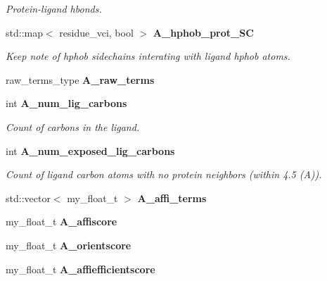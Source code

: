 \begin{CompactItemize}
\begin{CompactList}\small\item\em Protein-ligand hbonds. \item\end{CompactList}\item 
std::map$<$ residue\_\-vci, bool $>$ \bf{A\_\-hphob\_\-prot\_\-SC}\label{classSimSite3D_1_1ProtLigScore_d821097b1cb76b5bcc2e784d923c64f1}

\begin{CompactList}\small\item\em Keep note of hphob sidechains interating with ligand hphob atoms. \item\end{CompactList}\item 
raw\_\-terms\_\-type \textbf{A\_\-raw\_\-terms}\label{classSimSite3D_1_1ProtLigScore_6057aed97ad9d2f821e0243d0e991824}

\item 
int \bf{A\_\-num\_\-lig\_\-carbons}\label{classSimSite3D_1_1ProtLigScore_e8f1ebf48410e8bfa049bf7dad668351}

\begin{CompactList}\small\item\em Count of carbons in the ligand. \item\end{CompactList}\item 
int \bf{A\_\-num\_\-exposed\_\-lig\_\-carbons}\label{classSimSite3D_1_1ProtLigScore_6886d65b0975f0c237500478ba4a198c}

\begin{CompactList}\small\item\em Count of ligand carbon atoms with no protein neighbors (within 4.5 (A)). \item\end{CompactList}\item 
std::vector$<$ my\_\-float\_\-t $>$ \textbf{A\_\-affi\_\-terms}\label{classSimSite3D_1_1ProtLigScore_73c73cd82b0d7bfff4838314cd84ab0b}

\item 
my\_\-float\_\-t \textbf{A\_\-affiscore}\label{classSimSite3D_1_1ProtLigScore_7e1e577116eee25a76c19f55682c1558}

\item 
my\_\-float\_\-t \textbf{A\_\-orientscore}\label{classSimSite3D_1_1ProtLigScore_5535061a8d607e195cfc72d8836e5302}

\item 
my\_\-float\_\-t \textbf{A\_\-affiefficientscore}\label{classSimSite3D_1_1ProtLigScore_49bb696b0e08da39348198573860b0d7}


\end{CompactItemize}

